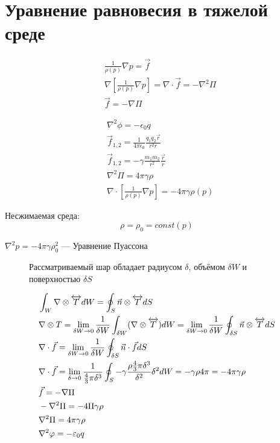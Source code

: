 \section{Уравнение равновесия в тяжелой среде}
\begin{align*}
  &\frac{1}{\rho(p)} \nabla p = \vec{f} \\
  &\nabla [\frac{1}{\rho(p)} \nabla p] = \nabla \cdot \vec{f}= -\nabla^2 \Pi \\
  &\vec{f} = -\nabla \Pi
\end{align*}

\begin{align*}
  &\nabla^2 \phi = - \epsilon_0 q\\
  &\vec{f}_{1, 2} = \frac{1}{4 \pi \epsilon_0} \frac{q_1 q_2 \vec{r}}{r^2 r} \\
  &\vec{f}_{1, 2} = -\gamma \frac{m_1 m_2}{r^2} \frac{\vec{r}}{r} \\
  &\nabla^2 \Pi = 4 \pi \gamma \rho \\
  &\nabla \cdot [ \frac{1}{\rho(p)} \nabla p] = -4 \pi \gamma \rho(p)
\end{align*}

Несжимаемая среда:
\[
  \rho = \rho_0 = const(p)
\]

\begin{defn}
  $\nabla^2 p = - 4 \pi \gamma \rho_0^2$ --- Уравнение Пуассона
\end{defn}

\begin{thm}
  \begin{figure}[h]
    \centering
     
    \caption{Рассматриваемый шар обладает радиусом $\delta$, объёмом $\delta W$ и поверхностью $\delta S$}
  \end{figure}
  \begin{align*}
    &\int_W \nabla \otimes \overleftrightarrow{T} dW = \oint_S \vec{n} \otimes \overleftrightarrow{T} dS \\
    &\nabla \otimes T = \lim_{\delta W \to 0} \frac{1}{\delta W} \int_{\delta W} (\nabla \otimes \overleftrightarrow{T}) dW = \lim_{\delta W \to 0} \frac{1}{\delta W} \oint_{\delta S} \vec{n} \otimes \overleftrightarrow{T} d S\\
    & \nabla \cdot \vec{f} = \lim_{\delta W \to 0} \frac{1}{\delta W} \oint_{\delta S} \vec{n} \cdot \vec{f} d S\\
    &\nabla \cdot \vec{f} = \lim_{\delta \to 0} \frac{1}{\frac 43 \pi \delta^3} \oint_S -\gamma \frac{\rho \frac 43 \pi \delta^3}{\delta^2} \delta^2 dW = -\gamma \rho 4 \pi = -4 \pi \gamma \rho \\
    &\vec{f} = -\nabla \Pi \\
    &-\nabla^2 \Pi = - 4\Pi \gamma \rho\\
    &\nabla^2 \Pi = 4 \pi \gamma \rho\\
    &\nabla^2 \varphi = -\varepsilon_0 q
  \end{align*}
\end{thm}


